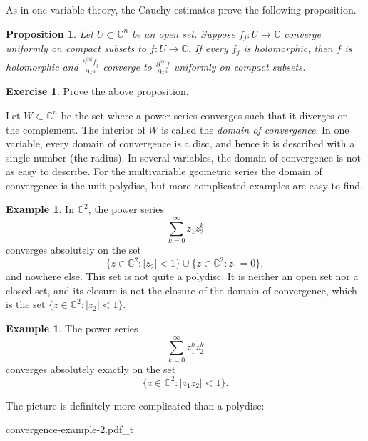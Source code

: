 \documentclass[12pt,openany]{book}
\newcommand{\sabs}[1]{\lvert {#1} \rvert}
\newcommand{\C}{{\mathbb{C}}}
\newcommand{\myindex}[1]{#1\index{#1}}
\theoremstyle{plain}
\newtheorem{prop}[thm]{Proposition}
\theoremstyle{remark}
\theoremstyle{definition}
\newenvironment{exbox}{%
    \def\FrameCommand{\vrule width 1pt \relax\hspace {10pt}}%
    \MakeFramed {\advance \hsize -\width \FrameRestore }%
}{%
    \endMakeFramed
}
\newenvironment{myfig}{%
    \begin{center}
}{%
    \end{center}
}
\theoremstyle{exercise}
\newtheorem{exercise}{Exercise}[section]
\theoremstyle{example}
\newtheorem{example}[thm]{Example}
\begin{document}
As in one-variable theory, the Cauchy estimates prove the following
proposition.

\begin{prop}
Let $U \subset \C^n$ be an open set.
Suppose $f_j \colon U \to \C$ converge uniformly on compact subsets
to $f \colon U \to \C$.  If every $f_j$ is holomorphic, then $f$ is
holomorphic and 
$\frac{\partial^{\sabs{\alpha}} f_j}{\partial z^\alpha}$ converge to
$\frac{\partial^{\sabs{\alpha}} f}{\partial z^\alpha}$ uniformly on compact
subsets.
\end{prop}

\begin{exbox}
\begin{exercise}
Prove the above proposition.
\end{exercise}
\end{exbox}

Let $W \subset \C^n$ be the set where a power series converges
such that it diverges on the complement.  The interior of $W$
is called the
\emph{\myindex{domain of convergence}}.
In one variable, every domain of convergence is a disc, and hence it is
described with a single number (the radius).
In several variables, the domain of convergence
is not as easy to describe.
For the multivariable geometric series 
the domain of convergence is the unit polydisc, but more
complicated examples are easy to find.

\begin{example}
In $\C^2$, the power series
\begin{equation*}
\sum_{k=0}^\infty z_1 z_2^k
\end{equation*}
converges absolutely on the set
\begin{equation*}
\bigl\{ z \in \C^2 : \sabs{z_2} < 1 \bigr\}
\cup
\bigl\{ z \in \C^2 : z_1 = 0 \bigr\} ,
\end{equation*}
and nowhere else.
This set is not quite a polydisc.  It is neither an open set nor a closed set,
and its closure is not the closure of the domain of convergence,
which is the set $\bigl\{ z \in \C^2 : \sabs{z_2} < 1 \bigr\}$.
\end{example}

\begin{example}
The power series
\begin{equation*}
\sum_{k=0}^\infty z_1^k z_2^k
\end{equation*}
converges absolutely exactly on the set
\begin{equation*}
\bigl\{ z \in \C^2 : \sabs{z_1 z_2} < 1 \bigr\} .
\end{equation*}

\pagebreak[2]
The picture is definitely more complicated than a polydisc:

\medskip

\begin{myfig}
{convergence-example-2.pdf_t}
\end{myfig}
\end{example}
\end{document}
